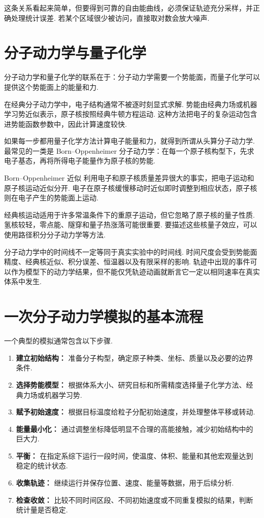 \documentclass[UTF8,11pt,a4paper,openany]{ctexbook}
\begin{document}
这条关系看起来简单，但要得到可靠的自由能曲线，必须保证轨迹充分采样，并正确处理统计误差. 若某个区域很少被访问，直接取对数会放大噪声. 

\section{分子动力学与量子化学}

分子动力学和量子化学的联系在于：分子动力学需要一个势能面，而量子化学可以提供这个势能面上的能量和力. 

在经典分子动力学中，电子结构通常不被逐时刻显式求解. 势能由经典力场或机器学习势近似表示，原子核按照经典牛顿方程运动. 这种方法把电子的复杂运动包含进势能函数参数中，因此计算速度较快. 

如果每一步都用量子化学方法计算电子能量和力，就得到所谓从头算分子动力学. 最常见的一类是 Born--Oppenheimer 分子动力学：在每一个原子核构型下，先求电子基态，再将所得电子能量作为原子核的势能. 

\begin{definitionbox}
Born--Oppenheimer 近似 利用电子和原子核质量差异很大的事实，把电子运动和原子核运动近似分开. 电子在原子核缓慢移动时近似即时调整到相应状态，原子核则在电子产生的势能面上运动. 
\end{definitionbox}

经典核运动适用于许多常温条件下的重原子运动，但它忽略了原子核的量子性质. 氢核较轻，零点能、隧穿和量子热涨落可能很重要. 要描述这些核量子效应，可以使用路径积分分子动力学等方法. 

\begin{limitbox}
分子动力学中的时间线不一定等同于真实实验中的时间线. 时间尺度会受到势能面精度、经典核近似、积分误差、恒温器以及有限采样的影响. 轨迹中出现的事件可以作为模型下的动力学结果，但不能仅凭轨迹动画就断言它一定以相同速率在真实体系中发生. 
\end{limitbox}

\section{一次分子动力学模拟的基本流程}

一个典型的模拟通常包含以下步骤. 

\begin{enumerate}
\item \textbf{建立初始结构：} 准备分子构型，确定原子种类、坐标、质量以及必要的边界条件. 
\item \textbf{选择势能模型：} 根据体系大小、研究目标和所需精度选择量子化学方法、经典力场或机器学习势. 
\item \textbf{赋予初始速度：} 根据目标温度给粒子分配初始速度，并处理整体平移或转动. 
\item \textbf{能量最小化：} 通过调整坐标降低明显不合理的高能接触，减少初始结构中的巨大力. 
\item \textbf{平衡：} 在指定系综下运行一段时间，使温度、体积、能量和其他宏观量达到稳定的统计状态. 
\item \textbf{收集轨迹：} 继续运行并保存位置、速度、能量等数据，用于后续分析. 
\item \textbf{检查收敛：} 比较不同时间区段、不同初始速度或不同重复模拟的结果，判断统计量是否稳定. 
\end{enumerate}
\end{document}
